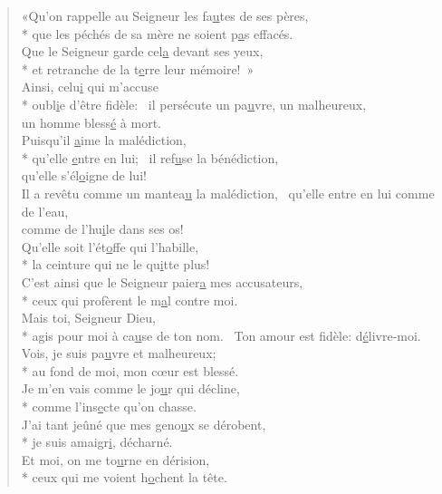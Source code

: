 \begin{verse}
«Qu’on rappelle au Seigneur les fa\underline{u}tes de ses pères, \\*
que les péchés de sa mère ne soient p\underline{a}s effacés. \\
Que le Seigneur garde cel\underline{a} devant ses yeux, \\*
et retranche de la t\underline{e}rre leur mémoire! » \\

Ainsi, celu\underline{i} qui m’accuse \\*
oubl\underline{i}e d’être fidèle:~\psalmstar
il persécute un pa\underline{u}vre, un malheureux, \\
un homme bless\underline{é} à mort. \\

Puisqu’il \underline{a}ime la malédiction, \\*
qu’elle \underline{e}ntre en lui;~\psalmstar
il ref\underline{u}se la bénédiction, \\
qu’elle s’él\underline{o}igne de lui! \\

Il a revêtu comme un mantea\underline{u} la malédiction,~\psalmstar
qu’elle entre en lui comme de l’eau, \\
comme de l’hu\underline{i}le dans ses os! \\
Qu’elle soit l’ét\underline{o}ffe qui l’habille, \\*
la ceinture qui ne le qu\underline{i}tte plus! \\

C’est ainsi que le Seigneur paier\underline{a} mes accusateurs, \\*
ceux qui profèrent le m\underline{a}l contre moi. \\

Mais toi, Seigneur Dieu, \\*
agis pour moi à ca\underline{u}se de ton nom.~\psalmstar
Ton amour est fidèle: d\underline{é}livre-moi. \\

Vois, je suis pa\underline{u}vre et malheureux; \\*
au fond de moi, mon cœur est blessé. \\
Je m’en vais comme le jo\underline{u}r qui décline, \\*
comme l’ins\underline{e}cte qu’on chasse. \\

J’ai tant jeûné que mes geno\underline{u}x se dérobent, \\*
je suis amaigr\underline{i}, décharné. \\
Et moi, on me to\underline{u}rne en dérision, \\*
ceux qui me voient h\underline{o}chent la tête. \\


\end{verse}
